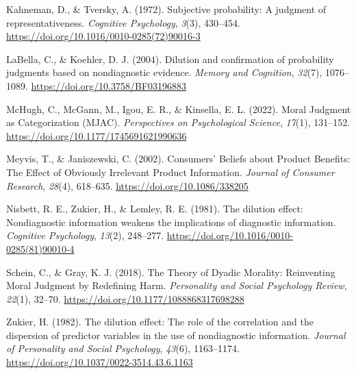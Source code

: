 \documentclass[
  man,floatsintext]{apa7}
\newlength{\cslhangindent}
\newenvironment{CSLReferences}[2] %
 {\begin{list}{}{%
  \setlength{\itemindent}{0pt}
  \setlength{\leftmargin}{0pt}
  \setlength{\parsep}{0pt}
  \ifodd #1
   \setlength{\leftmargin}{\cslhangindent}
   \setlength{\itemindent}{-1\cslhangindent}
  \fi
  \setlength{\itemsep}{#2\baselineskip}}}
 {\end{list}}
\begin{document}
\begin{CSLReferences}{1}{0}
Kahneman, D., \& Tversky, A. (1972). Subjective probability: {A} judgment of representativeness. \emph{Cognitive Psychology}, \emph{3}(3), 430--454. \url{https://doi.org/10.1016/0010-0285(72)90016-3}

LaBella, C., \& Koehler, D. J. (2004). Dilution and confirmation of probability judgments based on nondiagnostic evidence. \emph{Memory and Cognition}, \emph{32}(7), 1076--1089. \url{https://doi.org/10.3758/BF03196883}

McHugh, C., McGann, M., Igou, E. R., \& Kinsella, E. L. (2022). Moral {Judgment} as {Categorization} ({MJAC}). \emph{Perspectives on Psychological Science}, \emph{17}(1), 131--152. \url{https://doi.org/10.1177/1745691621990636}

Meyvis, T., \& Janiszewski, C. (2002). Consumers' {Beliefs} about {Product Benefits}: {The Effect} of {Obviously Irrelevant Product Information}. \emph{Journal of Consumer Research}, \emph{28}(4), 618--635. \url{https://doi.org/10.1086/338205}

Nisbett, R. E., Zukier, H., \& Lemley, R. E. (1981). The dilution effect: {Nondiagnostic} information weakens the implications of diagnostic information. \emph{Cognitive Psychology}, \emph{13}(2), 248--277. \url{https://doi.org/10.1016/0010-0285(81)90010-4}

Schein, C., \& Gray, K. J. (2018). The {Theory} of {Dyadic Morality}: {Reinventing Moral Judgment} by {Redefining Harm}. \emph{Personality and Social Psychology Review}, \emph{22}(1), 32--70. \url{https://doi.org/10.1177/1088868317698288}

Zukier, H. (1982). The dilution effect: {The} role of the correlation and the dispersion of predictor variables in the use of nondiagnostic information. \emph{Journal of Personality and Social Psychology}, \emph{43}(6), 1163--1174. \url{https://doi.org/10.1037/0022-3514.43.6.1163}

\end{CSLReferences}
\end{document}

